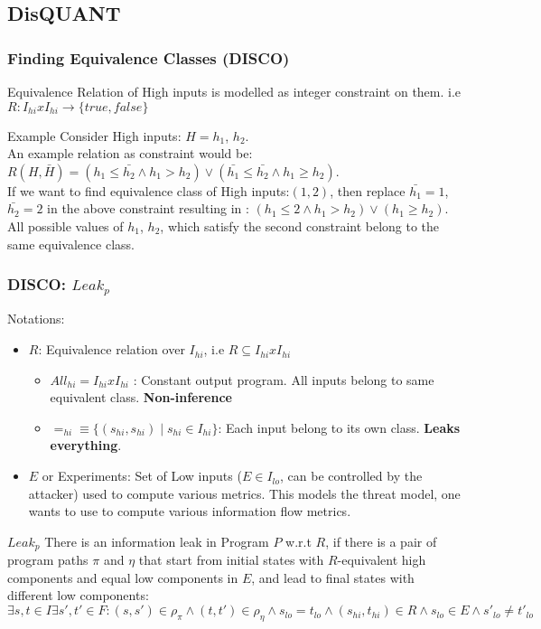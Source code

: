 \documentclass{beamer}
\begin{document}
\subsection{DisQUANT}
\begin{frame}
\frametitle{Finding Equivalence Classes (DISCO)}
Equivalence Relation of High inputs is modelled as integer constraint on them. i.e $R : I_{hi} x I_{hi} \rightarrow \{true,false\}$
\begin{block}{Example}
Consider High inputs: $H = h_{1}$, $h_{2}$.\\
An example relation as constraint would be: $R(H,\bar{H}) = (h_{1} \leq \bar{h_{2}} \land h_{1} > h_{2}) \lor (\bar{h_{1}} \leq \bar{h_{2}} \land h_{1} \geq h_{2})$.\\
If we want to find equivalence class of High inputs:$(1,2)$, then replace $\bar{h_{1}} = 1$, $\bar{h_{2}} = 2$ in the above constraint resulting in : $(h_{1} \leq 2 \land h_{1} > h_{2}) \lor (h_{1} \geq h_{2})$. \\
All possible values of $h_{1}$, $h_{2}$, which satisfy the second constraint belong to the same equivalence class.
\end{block}
\end{frame}

\begin{frame}
\frametitle{DISCO: $Leak_{p}$}
Notations:
\begin{itemize}
\item $R$: Equivalence relation over $I_{hi}$, i.e $R \subseteq I_{hi} x I_{hi}$
\begin{itemize}
\item $All_{hi} = I_{hi}  x  I_{hi}$ : Constant output program. All inputs belong to same equivalent class. \textbf{Non-inference}
\item $=_{hi}  \equiv  \{(s_{hi},s_{hi}) \mid s_{hi} \in I_{hi}\}$: Each input belong to its own class. \textbf{Leaks everything}.
\end{itemize}
\item $E$ or Experiments: Set of Low inputs ($E \in I_{lo}$, can be controlled by the attacker) used to compute various metrics. This models the threat model, one wants to use to compute various information flow metrics.
\end{itemize}
\begin{block}{$Leak_{p}$}
There is an information leak in Program $P$ w.r.t $R$, if there is a pair of program paths $\pi$ and $\eta$ that start from initial states with $R$-equivalent high components and equal low components in $E$, and lead to final states with different low components: $\exists s, t \in I   \exists s', t' \in F : (s, s') \in \rho_{\pi} \land (t, t') \in \rho_{\eta} \land s_{lo} = t_{lo} \land (s_{hi}, t_{hi}) \in R \land s_{lo} \in E \land s'_{lo} \neq t'_{lo}$

\end{block}
\end{frame}
\end{document}

